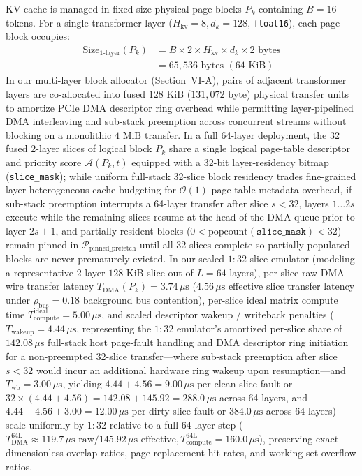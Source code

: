 \documentclass[conference,10pt]{IEEEtran}
\begin{document}
KV-cache is managed in fixed-size physical page blocks $P_k$ containing $B = 16$ tokens. For a single transformer layer ($H_{\text{kv}}=8, d_k=128$, \texttt{float16}), each page block occupies:
\begin{equation}
\label{eq:page_size}
\begin{aligned}
\text{Size}_{\text{1-layer}}(P_k) &= B \times 2 \times H_{\text{kv}} \times d_k \times 2\text{ bytes} \\
&= 65{,}536\text{ bytes } (64\text{ KiB})
\end{aligned}
\end{equation}
In our multi-layer block allocator (Section~VI-A), pairs of adjacent transformer layers are co-allocated into fused $128\text{ KiB}$ ($131{,}072\text{ byte}$) physical transfer units to amortize PCIe DMA descriptor ring overhead while permitting layer-pipelined DMA interleaving and sub-stack preemption across concurrent streams without blocking on a monolithic $4\text{ MiB}$ transfer. In a full 64-layer deployment, the 32 fused 2-layer slices of logical block $P_k$ share a single logical page-table descriptor and priority score $\mathcal{A}(P_k, t)$ equipped with a 32-bit layer-residency bitmap (\texttt{slice\_mask}); while uniform full-stack 32-slice block residency trades fine-grained layer-heterogeneous cache budgeting for $\mathcal{O}(1)$ page-table metadata overhead, if sub-stack preemption interrupts a 64-layer transfer after slice $s < 32$, layers $1\dots 2s$ execute while the remaining slices resume at the head of the DMA queue prior to layer $2s+1$, and partially resident blocks ($0 < \text{popcount}(\texttt{slice\_mask}) < 32$) remain pinned in $\mathcal{P}_{\text{pinned\_prefetch}}$ until all 32 slices complete so partially populated blocks are never prematurely evicted. In our scaled $1:32$ slice emulator (modeling a representative 2-layer $128\text{ KiB}$ slice out of $L=64$ layers), per-slice raw DMA wire transfer latency $T_{\text{DMA}}(P_k) = 3.74\,\mu\text{s}$ ($4.56\,\mu\text{s}$ effective slice transfer latency under $\rho_{\text{bus}} = 0.18$ background bus contention), per-slice ideal matrix compute time $T_{\text{compute}}^{\text{ideal}} = 5.00\,\mu\text{s}$, and scaled descriptor wakeup / writeback penalties ($T_{\text{wakeup}} = 4.44\,\mu\text{s}$, representing the $1:32$ emulator's amortized per-slice share of $142.08\,\mu\text{s}$ full-stack host page-fault handling and DMA descriptor ring initiation for a non-preempted 32-slice transfer—where sub-stack preemption after slice $s < 32$ would incur an additional hardware ring wakeup upon resumption—and $T_{\text{wb}} = 3.00\,\mu\text{s}$, yielding $4.44 + 4.56 = 9.00\,\mu\text{s}$ per clean slice fault or $32 \times (4.44 + 4.56) = 142.08 + 145.92 = 288.0\,\mu\text{s}$ across 64 layers, and $4.44 + 4.56 + 3.00 = 12.00\,\mu\text{s}$ per dirty slice fault or $384.0\,\mu\text{s}$ across 64 layers) scale uniformly by $1:32$ relative to a full 64-layer step ($T_{\text{DMA}}^{\text{64L}} \approx 119.7\,\mu\text{s}\text{ raw} / 145.92\,\mu\text{s}\text{ effective}, T_{\text{compute}}^{\text{64L}} = 160.0\,\mu\text{s}$), preserving exact dimensionless overlap ratios, page-replacement hit rates, and working-set overflow ratios.
\end{document}
